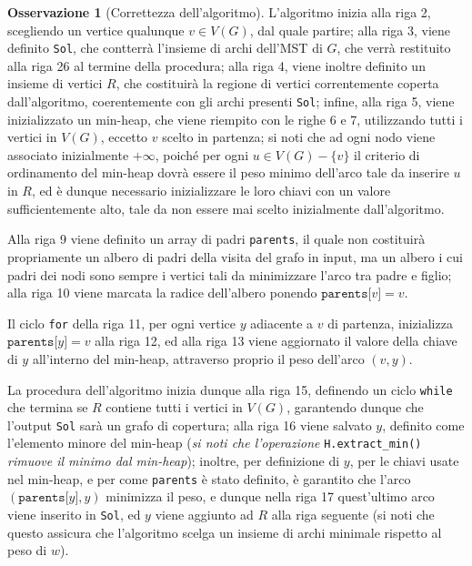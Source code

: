 \documentclass[14pt]{extreport}
\theoremstyle{definition}
\theoremstyle{definition}
\newtheorem{remark}{Osservazione}[subsection]
\begin{document}
\begin{remark}[Correttezza dell'algoritmo]
    L'algoritmo inizia alla riga 2, scegliendo un vertice qualunque $v \in V(G)$, dal quale partire; alla riga 3, viene definito \texttt{Sol}, che contterrà l'insieme di archi dell'MST di $G$, che verrà restituito alla riga 26 al termine della procedura; alla riga 4, viene inoltre definito un insieme di vertici $R$, che costituirà la regione di vertici correntemente coperta dall'algoritmo, coerentemente con gli archi presenti \texttt{Sol}; infine, alla riga 5, viene inizializzato un min-heap, che viene riempito con le righe 6 e 7, utilizzando tutti i vertici in $V(G)$, eccetto $v$ scelto in partenza; si noti che ad ogni nodo viene associato inizialmente $+ \infty$, poiché per ogni $u \in V(G) - \{v\}$ il criterio di ordinamento del min-heap dovrà essere il peso minimo dell'arco tale da inserire $u$ in $R$, ed è dunque necessario inizializzare le loro chiavi con un valore sufficientemente alto, tale da non essere mai scelto inizialmente dall'algoritmo.

    Alla riga 9 viene definito un array di padri \texttt{parents}, il quale non costituirà propriamente un albero di padri della visita del grafo in input, ma un albero i cui padri dei nodi sono sempre i vertici tali da minimizzare l'arco tra padre e figlio; alla riga 10 viene marcata la radice dell'albero ponendo $\texttt{parents[}v\texttt{]} = v$.

    Il ciclo \texttt{for} della riga 11, per ogni vertice $y$ adiacente a $v$ di partenza, inizializza $\texttt{parents[}y\texttt{]} = v$ alla riga 12, ed alla riga 13 viene aggiornato il valore della chiave di $y$ all'interno del min-heap, attraverso proprio il peso dell'arco $(v, y)$.

    La procedura dell'algoritmo inizia dunque alla riga 15, definendo un ciclo \texttt{while} che termina se $R$ contiene tutti i vertici in $V(G)$, garantendo dunque che l'output \texttt{Sol} sarà un grafo di copertura; alla riga 16 viene salvato $y$, definito come l'elemento minore del min-heap (\textit{si noti che l'operazione} \texttt{H.extract\_min()} \textit{rimuove il minimo dal min-heap}); inoltre, per definizione di $y$, per le chiavi usate nel min-heap, e per come \texttt{parents} è stato definito, è garantito che l'arco $(\texttt{parents[}y\texttt{]}, y)$ minimizza il peso, e dunque nella riga 17 quest'ultimo arco viene inserito in \texttt{Sol}, ed $y$ viene aggiunto ad $R$ alla riga seguente (si noti che questo assicura che l'algoritmo scelga un insieme di archi minimale rispetto al peso di $w$).


\end{remark}
\end{document}
